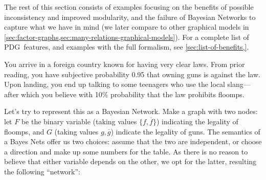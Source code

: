 \documentclass{article}
\newcommand\changed[1]{{\color{note-fg} #1}}
\newcommand{\MN}{PDG}
\begin{document}
	
	The rest of this section consists of examples focusing on the benefits of possible inconsistency and improved modularity, and the failure of \changed{Bayesian Networks} to capture what we have in mind \changed{(we later compare to other graphical models in \cref{sec:factor-graphs,sec:many-relations-graphical-models}). For a complete list of \MN\ features, and examples with the full formalism,} see \cref{sec:list-of-benefits,}.
	
	\begin{example}\label{ex:guns-and-floomps}
		You arrive in a foreign country known for having very clear laws. From prior reading, you have subjective probability 0.95 that owning guns is against the law. Upon landing, you end up talking to some teenagers who use the local slang---after which you believe with 10\% probability that the law prohibits floomps.
		
		Let's try to represent this as a Bayesian Network. Make a graph with two nodes: let $F$ be the binary variable (taking values $\{f, \overline f\}$) indicating the legality of floomps, and $G$ (taking values $g, \overline g$) indicate the legality of guns. 
		The semantics of a Bayes Nets offer us two choices: assume that the two are independent, or choose a direction and make up some numbers for the table.
		As there is no reason to believe that either variable depends on the other, we opt for the latter, resulting the following ``network'':	
		
		\begin{center}
		\end{center}
		

\end{example}
\end{document}
